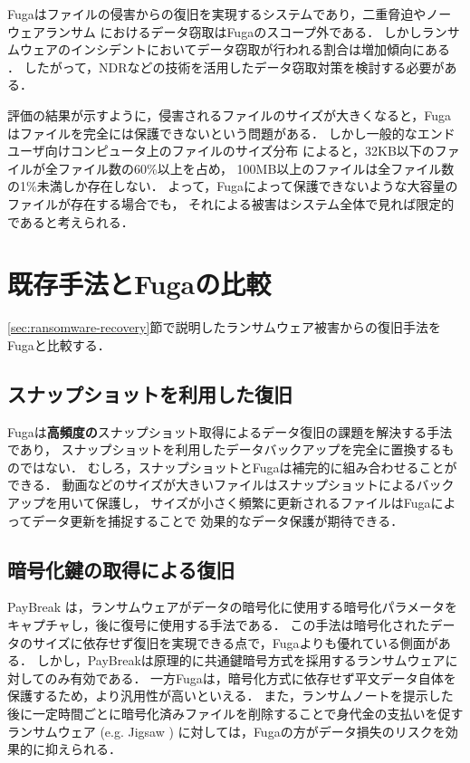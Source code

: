 Fugaはファイルの侵害からの復旧を実現するシステムであり，二重脅迫やノーウェアランサム \cite{nowhere-ransom} におけるデータ窃取はFugaのスコープ外である．
しかしランサムウェアのインシデントにおいてデータ窃取が行われる割合は増加傾向にある \cite{sophos-report:online}．
したがって，NDRなどの技術を活用したデータ窃取対策を検討する必要がある．

評価の結果が示すように，侵害されるファイルのサイズが大きくなると，Fugaはファイルを完全には保護できないという問題がある．
しかし一般的なエンドユーザ向けコンピュータ上のファイルのサイズ分布 \cite{file-size-dist} によると，32KB以下のファイルが全ファイル数の60\%以上を占め，
100MB以上のファイルは全ファイル数の1\%未満しか存在しない．
よって，Fugaによって保護できないような大容量のファイルが存在する場合でも，
それによる被害はシステム全体で見れば限定的であると考えられる．


\section{既存手法とFugaの比較}
\ref{sec:ransomware-recovery}節で説明したランサムウェア被害からの復旧手法をFugaと比較する．
\subsection{スナップショットを利用した復旧}
Fugaは\textbf{高頻度の}スナップショット取得によるデータ復旧の課題を解決する手法であり，
スナップショットを利用したデータバックアップを完全に置換するものではない．
むしろ，スナップショットとFugaは補完的に組み合わせることができる．
動画などのサイズが大きいファイルはスナップショットによるバックアップを用いて保護し，
サイズが小さく頻繁に更新されるファイルはFugaによってデータ更新を捕捉することで
効果的なデータ保護が期待できる．

\subsection{暗号化鍵の取得による復旧}
PayBreak \cite{kolodenker2017paybreak}は，ランサムウェアがデータの暗号化に使用する暗号化パラメータをキャプチャし，後に復号に使用する手法である．
この手法は暗号化されたデータのサイズに依存せず復旧を実現できる点で，Fugaよりも優れている側面がある．
しかし，PayBreakは原理的に共通鍵暗号方式を採用するランサムウェアに対してのみ有効である．
一方Fugaは，暗号化方式に依存せず平文データ自体を保護するため，より汎用性が高いといえる．
また，ランサムノートを提示した後に一定時間ごとに暗号化済みファイルを削除することで身代金の支払いを促すランサムウェア (e.g. Jigsaw \cite{byrne2017jigsaw})
に対しては，Fugaの方がデータ損失のリスクを効果的に抑えられる．

